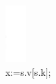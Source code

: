 \documentclass[10pt]{article}
\begin{document}
\includegraphics[max width=\textwidth, center]{2025_04_17_46e04c6acd873ea9558dg-021(6)}\\[0pt]
x:=s.v[s.k];
\end{document}
